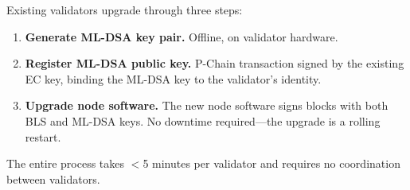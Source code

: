 Existing validators upgrade through three steps:

\begin{enumerate}[leftmargin=2em]
\item \textbf{Generate ML-DSA key pair.} Offline, on validator hardware.
\item \textbf{Register ML-DSA public key.} P-Chain transaction signed by the existing EC key, binding the ML-DSA key to the validator's identity.
\item \textbf{Upgrade node software.} The new node software signs blocks with both BLS and ML-DSA keys. No downtime required---the upgrade is a rolling restart.
\end{enumerate}

The entire process takes $<$5 minutes per validator and requires no coordination between validators.

